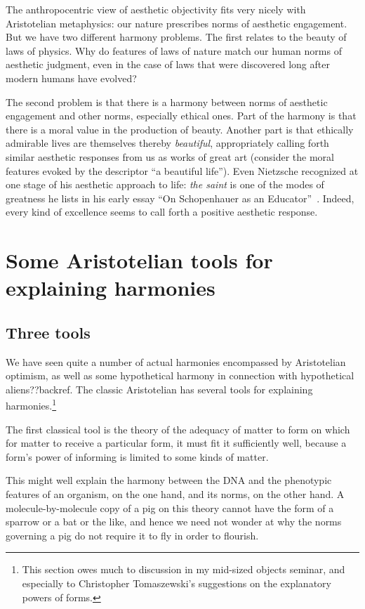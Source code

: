 The anthropocentric view of aesthetic objectivity fits very nicely with Aristotelian metaphysics: our
nature prescribes norms of aesthetic engagement. But we have two different harmony problems. The first relates
to the beauty of laws of physics. Why do features of laws of nature match our human norms of aesthetic 
judgment, even in the case of laws that were discovered long after modern humans have evolved? 

The second problem is that there is a harmony between norms of aesthetic engagement and other norms, especially 
ethical ones. Part of the harmony is that there is a moral value in the production of beauty.  Another part
is that ethically admirable lives are themselves thereby
\textit{beautiful}, appropriately calling forth similar aesthetic responses from us as works of great 
art (consider the moral features evoked by the descriptor ``a beautiful life''). 
Even Nietzsche recognized at one stage of his aesthetic approach to life: \textit{the saint} is one of the modes of greatness
he lists in his early essay ``On Schopenhauer as an Educator''~\parencite{NietzscheUntimely}. Indeed, every kind of excellence seems to call forth a positive aesthetic response.

\section{Some Aristotelian tools for explaining harmonies}
\subsection{Three tools}
We have seen quite a number of actual harmonies encompassed by Aristotelian optimism, as well as some hypothetical 
harmony in connection with hypothetical aliens??backref. The classic Aristotelian has several tools for explaining  
harmonies.\footnote{This section owes much to discussion in my mid-sized objects seminar, and especially to 
Christopher Tomaszewski's suggestions on the explanatory powers of forms.}

The first classical tool is the theory of the adequacy of matter to form on which for matter to receive a particular 
form, it must fit it sufficiently well, because a form's power of informing is limited to some kinds of matter. 

This might well explain the harmony between the DNA and the phenotypic features of an organism, on the one hand, 
and its norms, on the other hand. A molecule-by-molecule copy of a pig on this theory cannot have the form of a sparrow or 
a bat or the like, and hence we need not wonder at why the norms governing a pig do not require it to fly in order to flourish.


